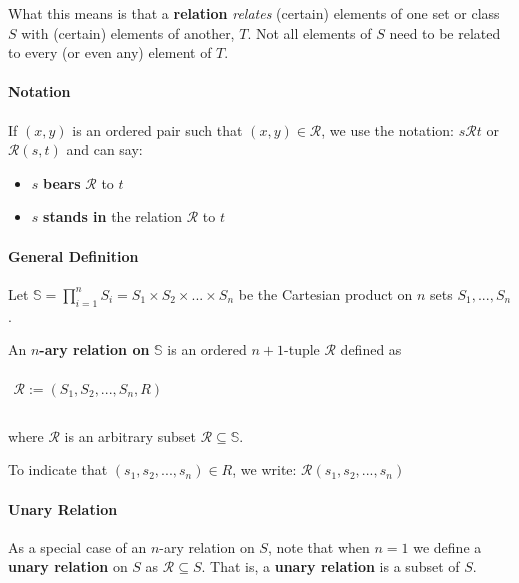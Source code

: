 What this means is that a \textbf{relation} \textit{relates} (certain)
elements of one set or class $S$ with (certain) elements of another,
$T$. Not all elements of $S$ need to be related to every (or even any)
element of $T$.

\paragraph{Notation}

If $(x, y)$ is an ordered pair such that $(x, y) \in \mathcal{R}$, we
use the notation: $ s \mathcal{R} t$ or $ \mathcal{R}(s, t)$ and can
say:
\begin{itemize}
\item $s$ \textbf{bears} $\mathcal{R}$ to $t$
\item $s$ \textbf{stands in} the relation $\mathcal{R}$ to $t$
\end{itemize}

\paragraph{General Definition}

Let
$\mathbb{S} = \displaystyle \prod_{i=1}^n S_i = S_1 \times S_2 \times ... \times S_n $
be the Cartesian product on $n$ sets $S_1, ..., S_n$.

An \textbf{$n$-ary relation on} $\mathbb{S}$ is an ordered
$n+1$-tuple $\mathcal{R}$ defined as

\begin{math}
  \begin{array}{c}
    \\
    \mathcal{R} := (S_1, S_2, ..., S_n, R)\\
    \\
  \end{array}
\end{math}

where $\mathcal{R}$ is an arbitrary subset
$\mathcal{R} \subseteq \mathbb{S}$.

To indicate that $(s_1, s_2, ..., s_n) \in R$, we write:
$\mathcal{R}(s_1, s_2, ..., s_n)$


\paragraph{Unary Relation}

As a special case of an $n$-ary relation on $S$, note that when $n=1$
we define a \textbf{unary relation} on $S$ as
$\mathcal{R} \subseteq S$. That is, a \textbf{unary relation} is a
subset of $S$.



